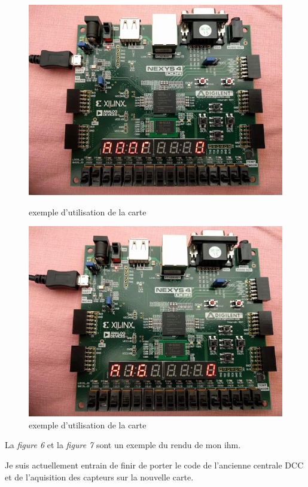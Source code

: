 \begin{figure}[ht]
    \begin{minipage}[c]{.46\linewidth}
        \centering
        \includegraphics[scale=0.25]{exe_add.jpg}
        \caption{exemple d'utilisation de la carte}
        \label{fig6}
    \end{minipage}
    \hfill%
    \begin{minipage}[c]{.46\linewidth}
        \centering
        \includegraphics[scale=0.25]{exe_aigui.jpg}
        \caption{exemple d'utilisation de la carte}
        \label{fig7}
    \end{minipage}
\end{figure}

La \emph{figure 6} et la \emph{figure 7} sont un exemple du rendu de
mon ihm.

Je suis actuellement entrain de finir de porter le code de l'ancienne
centrale DCC et de l'aquisition des capteurs sur la nouvelle carte.

\newpage





